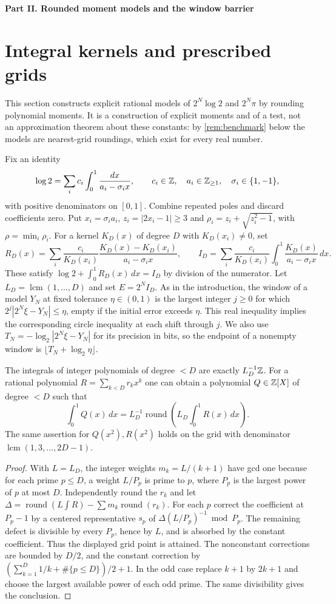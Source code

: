 \documentclass[11pt]{article}
\DeclareMathOperator{\lcm}{lcm}
\DeclareMathOperator{\round}{round}
\newcommand{\partmark}[1]{\bigskip\par\begin{center}{\large\bfseries #1}\end{center}\nopagebreak\smallskip}
\begin{document}
\partmark{Part II. Rounded moment models and the window barrier}

\section{Integral kernels and prescribed grids}\label{sec:kernels}

This section constructs explicit rational models of $2^N\log2$ and $2^N\pi$ by rounding polynomial moments. It is a construction of explicit moments and of a test, not an approximation theorem about these constants: by \cref{rem:benchmark} below the models are nearest-grid roundings, which exist for every real number.

Fix an identity
\[
\log 2=\sum_i c_i\int_0^1\frac{dx}{a_i-\sigma_i x},
\qquad c_i\in\mathbb Z,\quad a_i\in\mathbb Z_{\ge1},\quad \sigma_i\in\{1,-1\},
\]
with positive denominators on $[0,1]$. Combine repeated poles and discard coefficients zero. Put $x_i=\sigma_i a_i$, $z_i=|2x_i-1|\ge3$ and $\rho_i=z_i+\sqrt{z_i^2-1}$, with $\rho=\min_i\rho_i$. For a kernel $K_D(x)$ of degree $D$ with $K_D(x_i)\ne0$, set
\[
 R_D(x)=\sum_i\frac{c_i}{K_D(x_i)}
            \frac{K_D(x)-K_D(x_i)}{a_i-\sigma_i x},\qquad
 I_D=\sum_i\frac{c_i}{K_D(x_i)}\int_0^1\frac{K_D(x)}{a_i-\sigma_i x}\,dx.
\]
These satisfy $\log 2+\int_0^1R_D(x)\,dx=I_D$ by division of the numerator. Let $L_D=\lcm(1,\ldots,D)$ and set $E=2^N I_D$. As in the introduction, the window of a model $Y_N$ at fixed tolerance $\eta\in(0,1)$ is the largest integer $j\ge0$ for which $2^j|2^N\xi-Y_N|\le\eta$, empty if the initial error exceeds $\eta$. This real inequality implies the corresponding circle inequality at each shift through $j$. We also use $T_N=-\log_2|2^N\xi-Y_N|$ for its precision in bits, so the endpoint of a nonempty window is $\lfloor T_N+\log_2\eta\rfloor$.

\begin{proposition}\label{prop:bezout}
The integrals of integer polynomials of degree $<D$ are exactly $L_D^{-1}\mathbb Z$. For a rational polynomial $R=\sum_{k<D}r_k x^k$ one can obtain a polynomial $Q\in\mathbb Z[X]$ of degree $<D$ such that
\[
 \int_0^1Q(x)\,dx=L_D^{-1}\round\!\left(L_D\int_0^1R(x)\,dx\right).
\]
The same assertion for $Q(x^2),R(x^2)$ holds on the grid with denominator $\lcm(1,3,\ldots,2D-1)$.
\end{proposition}
\begin{proof}
With $L=L_D$, the integer weights $m_k=L/(k+1)$ have gcd one because for each prime $p\le D$, a weight $L/P_p$ is prime to $p$, where $P_p$ is the largest power of $p$ at most $D$. Independently round the $r_k$ and let $\Delta=\round(L\int R)-\sum m_k\round(r_k)$. For each $p$ correct the coefficient at $P_p-1$ by a centered representative $s_p$ of $\Delta(L/P_p)^{-1}\bmod P_p$. The remaining defect is divisible by every $P_p$, hence by $L$, and is absorbed by the constant coefficient. Thus the displayed grid point is attained. The nonconstant corrections are bounded by $D/2$, and the constant correction by $(\sum_{k=1}^D1/k+\#\{p\le D\})/2+1$. In the odd case replace $k+1$ by $2k+1$ and choose the largest available power of each odd prime. The same divisibility gives the conclusion.
\end{proof}
\end{document}
